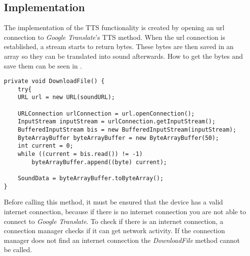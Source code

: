 \subsection{Implementation}
The implementation of the TTS functionality is created by opening an url connection to \textit{Google Translate}'s TTS method.
When the url connection is established, a stream starts to return bytes.
These bytes are then saved in an array so they can be translated into sound afterwards.
How to get the bytes and save them can be seen in .

\begin{lstlisting}[caption={Download Sound event},label={lst:download-sound}]
private void DownloadFile() {
    try{
    URL url = new URL(soundURL);

    URLConnection urlConnection = url.openConnection();
    InputStream inputStream = urlConnection.getInputStream();
    BufferedInputStream bis = new BufferedInputStream(inputStream);
    ByteArrayBuffer byteArrayBuffer = new ByteArrayBuffer(50);
    int current = 0;
    while ((current = bis.read()) != -1)
        byteArrayBuffer.append((byte) current);

    SoundData = byteArrayBuffer.toByteArray();
}
\end{lstlisting} 

Before calling this method, it must be ensured that the device has a valid internet connection, because if there is no internet connection you are not able to connect to \textit{Google Translate}.
To check if there is an internet connection, a connection manager checks if it can get network activity.
If the connection manager does not find an internet connection the \textit{DownloadFile} method cannot be called.